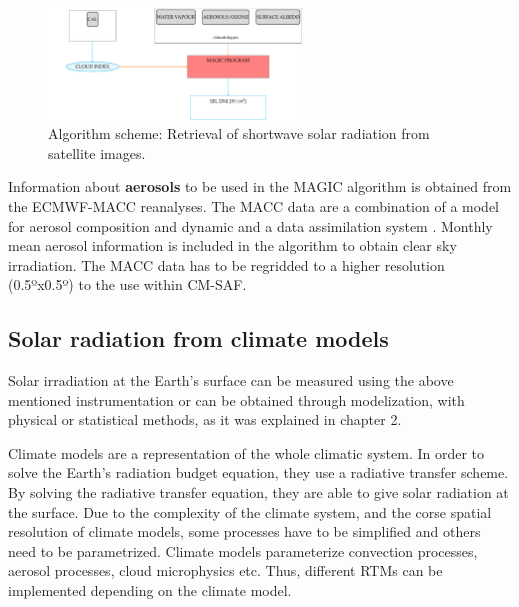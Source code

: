 \begin{figure}
  \centering
  \includegraphics[width=0.6\textwidth]{figs/esquemasat.pdf}
  \caption[Retrieval of solar irradiation from satellites]{Algorithm scheme: Retrieval of shortwave solar radiation from satellite images.}
 \label{fig:algorithm}
\end{figure}

Information about \textbf{aerosols} to be used in the MAGIC algorithm is obtained from the ECMWF-MACC reanalyses. The MACC \cite*{MACC} data are a combination of a model for aerosol composition and dynamic \cite*{Morcrette2009} and a data assimilation system \cite*{Benedetti2009}. Monthly mean aerosol information is included in the algorithm to obtain clear sky irradiation. The MACC data has to be regridded to a higher resolution (0.5ºx0.5º) to the use within CM-SAF.



\subsection{Solar radiation from climate models}%


Solar irradiation at the Earth's surface can be measured using the above mentioned instrumentation or can be obtained through modelization, with physical or statistical methods, as it was explained in chapter 2.

Climate models are a representation of the whole climatic system. In order to solve the Earth's radiation budget equation, they use a radiative transfer scheme. By solving the radiative transfer equation, they are able to give solar radiation at the surface. Due to the complexity of the climate system, and the corse spatial resolution of climate models, some processes have to be simplified and others need to be parametrized. Climate models parameterize convection processes, aerosol processes, cloud microphysics etc. Thus, different RTMs can be implemented depending on the climate model.

